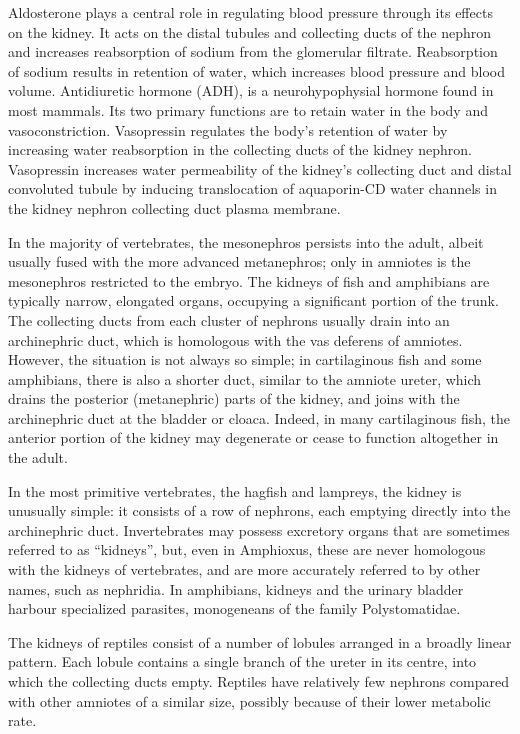 Aldosterone plays a central role in regulating blood pressure through its effects on the kidney. It acts on the distal tubules and collecting ducts of the nephron and increases reabsorption of sodium from the glomerular filtrate. Reabsorption of sodium results in retention of water, which increases blood pressure and blood volume. Antidiuretic hormone (ADH), is a neurohypophysial hormone found in most mammals. Its two primary functions are to retain water in the body and vasoconstriction. Vasopressin regulates the body's retention of water by increasing water reabsorption in the collecting ducts of the kidney nephron. Vasopressin increases water permeability of the kidney's collecting duct and distal convoluted tubule by inducing translocation of aquaporin-CD water channels in the kidney nephron collecting duct plasma membrane.

In the majority of vertebrates, the mesonephros persists into the adult, albeit usually fused with the more advanced metanephros; only in amniotes is the mesonephros restricted to the embryo. The kidneys of fish and amphibians are typically narrow, elongated organs, occupying a significant portion of the trunk. The collecting ducts from each cluster of nephrons usually drain into an archinephric duct, which is homologous with the vas deferens of amniotes. However, the situation is not always so simple; in cartilaginous fish and some amphibians, there is also a shorter duct, similar to the amniote ureter, which drains the posterior (metanephric) parts of the kidney, and joins with the archinephric duct at the bladder or cloaca. Indeed, in many cartilaginous fish, the anterior portion of the kidney may degenerate or cease to function altogether in the adult.

In the most primitive vertebrates, the hagfish and lampreys, the kidney is unusually simple: it consists of a row of nephrons, each emptying directly into the archinephric duct. Invertebrates may possess excretory organs that are sometimes referred to as ``kidneys'', but, even in Amphioxus, these are never homologous with the kidneys of vertebrates, and are more accurately referred to by other names, such as nephridia. In amphibians, kidneys and the urinary bladder harbour specialized parasites, monogeneans of the family Polystomatidae.

The kidneys of reptiles consist of a number of lobules arranged in a broadly linear pattern. Each lobule contains a single branch of the ureter in its centre, into which the collecting ducts empty. Reptiles have relatively few nephrons compared with other amniotes of a similar size, possibly because of their lower metabolic rate.

